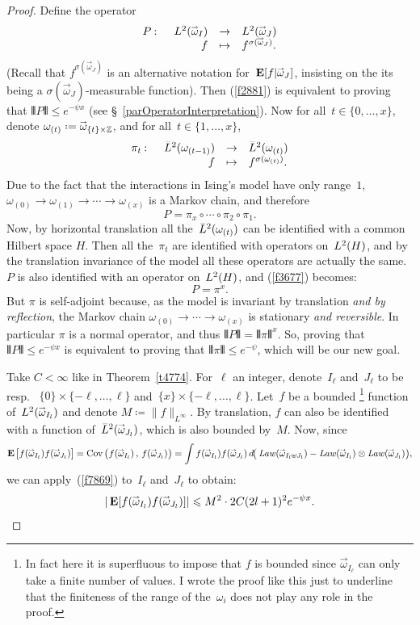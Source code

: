 \begin{proof}
Define the operator
\[ \begin{array}{rrcl} P \colon & \ldb(\vec\omega_I) & \to & \ldb(\vec\omega_J) \\
& f & \mapsto & f^{\sigma(\vec\omega_J)} .\end{array} \]
(Recall that $f^{\sigma(\vec\omega_J)}$ is an alternative notation for~$\EE[f|\vec\omega_J]$,
insisting on the its being a $\sigma(\vec\omega_J)$-measurable function).
Then (\ref{f2881}) is equivalent to proving that
$\VERT P \VERT \leq e^{-\psi x}$ (see \S~\ref{parOperatorInterpretation}).
Now for all~$t \in \{0,\ldots,x\}$, denote $\omega_{(t)} \coloneqq \vec\omega_{\{t\}\times\ZZ}$,
and for all~$t \in \{1,\ldots,x\}$,
\[ \begin{array}{rrcl} \pi_t \colon & \ldb(\omega_{(t-1)}) & \to & \ldb(\omega_{(t)}) \\
& f & \mapsto & f^{\sigma(\omega_{(t)})} .\end{array}\]
Due to the fact that the interactions in Ising's model have only range~$1$,
$\omega_{(0)} \to \omega_{(1)} \to \cdots \to \omega_{(x)}$
is a Markov chain, and therefore
\[\label{f3677} P = \pi_x \circ \cdots \circ \pi_2 \circ \pi_1 .\]
Now, by horizontal translation all the~$\ldb(\omega_{(t)})$ can be identified
with a common Hilbert space $H$.
Then all the~$\pi_t$ are identified with operators on~$\ldb(H)$,
and by the translation invariance of the model all these operators are actually the same.
$P$ is also identified with an operator on~$\ldb(H)$, and (\ref{f3677}) becomes:
\[ P = \pi^x .\]
But $\pi$ is self-adjoint because,
as the model is invariant by translation \emph{and by reflection},
the Markov chain $\omega_{(0)} \to \cdots \to \omega_{(x)}$
is stationary \emph{and reversible}.
In particular $\pi$ is a normal operator, and thus $\VERT P \VERT = \VERT \pi \VERT^x$.
So, proving that $\VERT P \VERT \leq e^{-\psi x}$
is equivalent to proving that $\VERT \pi \VERT \leq e^{-\psi}$,
which will be our new goal.

Take $C<\infty$ like in Theorem~\ref{t4774}.
For~$\ell$ an integer, denote~$I_\ell$ and~$J_\ell$ to be resp.~%
$\{0\}\times\{-\ell,\ldots,\ell\}$ and~$\{x\}\times\{-\ell,\ldots,\ell\}$.
Let~$f$ be a bounded%
\footnote{In fact here it is superfluous to impose that $f$ is bounded since
$\vec\omega_{I_\ell}$ can only take a finite number of values.
I wrote the proof like this just to underline
that the finiteness of the range of the~$\omega_i$ does not play any role in the proof.}
function of~$\ldb(\vec\omega_{I_\ell})$ and denote $M \coloneqq \|f\|_{L^\infty}$.
By translation, $f$ can also be identified with
a function of~$\ldb(\vec\omega_{J_\ell})$,
which is also bounded by~$M$.
%
Now, since
\[ \EE \big[ f(\vec\omega_{I_\ell})f(\vec\omega_{J_\ell}) \big] =
\Cov \big( f(\vec\omega_{I_\ell}) \,,\, f(\vec\omega_{J_\ell}) \big) \\
= \int f(\vec\omega_{I_\ell})f(\vec\omega_{J_\ell}) \,
\dx{\big(\Law(\vec\omega_{I_\ell\uplus J_\ell})} -
\Law(\vec\omega_{I_\ell})\otimes\Law(\vec\omega_{J_\ell})\big) ,
\]
we can apply~(\ref{f7869}) to~$I_{\ell}$ and~$J_{\ell}$ to obtain:
\[\label{f3079} | \EE[f(\vec\omega_{I_\ell})f(\vec\omega_{J_\ell})] |
\leq M^2\cdot 2C(2\ell+1)^2 e^{-\psi x} .\]


\end{proof}
